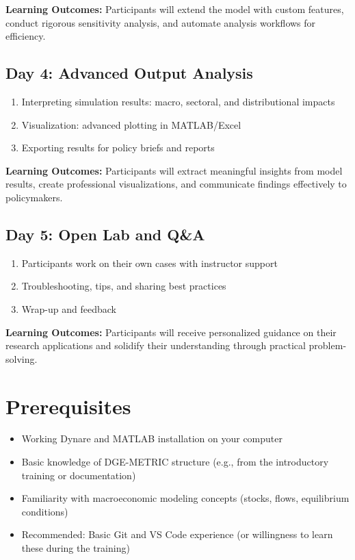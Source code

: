 \documentclass[11pt]{article}
\begin{document}
\textbf{Learning Outcomes:} Participants will extend the model with custom features, conduct rigorous sensitivity analysis, and automate analysis workflows for efficiency.

\subsection*{Day 4: Advanced Output Analysis}

\begin{enumerate}
    \item Interpreting simulation results: macro, sectoral, and distributional impacts
    \item Visualization: advanced plotting in MATLAB/Excel
    \item Exporting results for policy briefs and reports
\end{enumerate}

\textbf{Learning Outcomes:} Participants will extract meaningful insights from model results, create professional visualizations, and communicate findings effectively to policymakers.

\subsection*{Day 5: Open Lab and Q\&A}

\begin{enumerate}
    \item Participants work on their own cases with instructor support
    \item Troubleshooting, tips, and sharing best practices
    \item Wrap-up and feedback
\end{enumerate}

\textbf{Learning Outcomes:} Participants will receive personalized guidance on their research applications and solidify their understanding through practical problem-solving.

\section*{Prerequisites}

\begin{itemize}
    \item Working Dynare and MATLAB installation on your computer
    
    \item Basic knowledge of DGE-METRIC structure (e.g., from the introductory training or documentation)
    
    \item Familiarity with macroeconomic modeling concepts (stocks, flows, equilibrium conditions)
    
    \item Recommended: Basic Git and VS Code experience (or willingness to learn these during the training)
\end{itemize}
\end{document}
